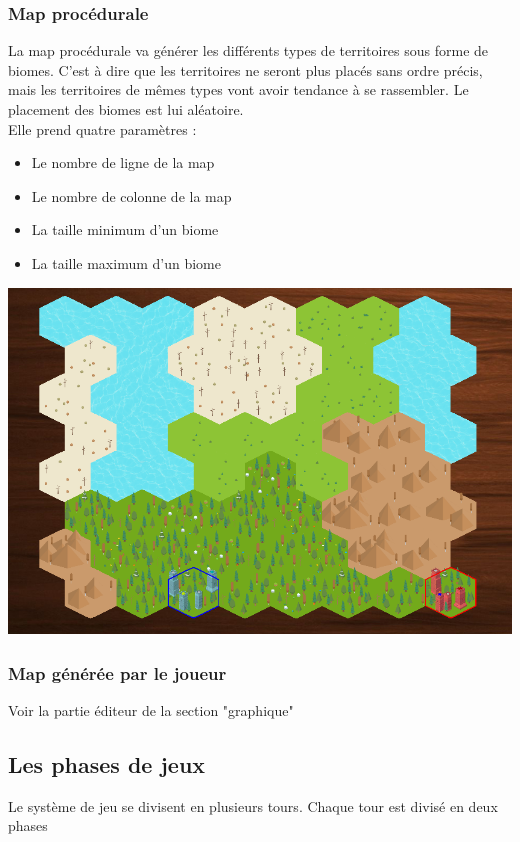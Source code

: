       
      \subsubsection{Map procédurale}
	La map procédurale va générer les différents types de territoires sous forme de biomes. C'est à dire que les territoires ne seront plus placés sans ordre précis, mais les
	territoires de mêmes types vont avoir tendance à se rassembler. Le placement des biomes est lui aléatoire. \\
	Elle prend quatre paramètres :
	\begin{itemize}
	  \item Le nombre de ligne de la map
	  \item Le nombre de colonne de la map
	  \item La taille minimum d'un biome
	  \item La taille maximum d'un biome
	\end{itemize}
	\vspace{0.5cm}
	
	\includegraphics[scale=0.7]{map/procedural.PNG}
	
      \subsubsection{Map générée par le joueur}
	Voir la partie éditeur de la section "graphique"
    
    \subsection{Les phases de jeux}
      Le système de jeu se divisent en plusieurs tours. Chaque tour est divisé en deux phases
      
